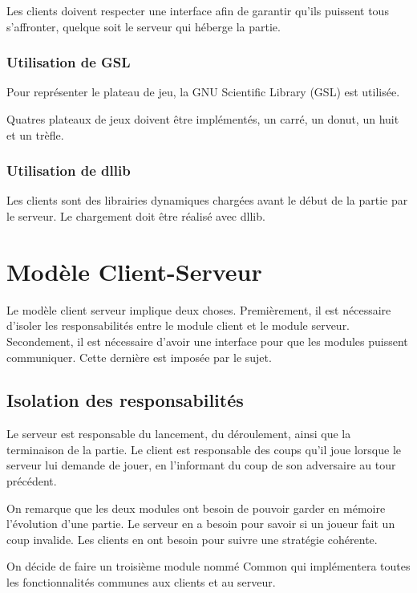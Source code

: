\documentclass{article}
\begin{document}
Les clients doivent respecter une interface afin de garantir qu'ils puissent tous s'affronter,
quelque soit le serveur qui héberge la partie.

\subsubsection{Utilisation de GSL}

Pour représenter le plateau de jeu, la GNU Scientific Library (GSL) est utilisée.

Quatres plateaux de jeux doivent être implémentés, un carré, un donut, un huit et un trèfle.

\subsubsection{Utilisation de dllib}

Les clients sont des librairies dynamiques chargées avant le début de la partie par le serveur.
Le chargement doit être réalisé avec dllib.

\section{Modèle Client-Serveur}

Le modèle client serveur implique deux choses.
Premièrement, il est nécessaire d'isoler les responsabilités entre le module client et le module serveur.
Secondement, il est nécessaire d'avoir une interface pour que les modules puissent communiquer.
Cette dernière est imposée par le sujet.

\subsection{Isolation des responsabilités}

Le serveur est responsable du lancement, du déroulement, ainsi que la terminaison de la partie.
Le client est responsable des coups qu'il joue lorsque le serveur lui demande de jouer, 
en l'informant du coup de son adversaire au tour précédent.

On remarque que les deux modules ont besoin de pouvoir garder en mémoire l'évolution d'une partie.
Le serveur en a besoin pour savoir si un joueur fait un coup invalide.
Les clients en ont besoin pour suivre une stratégie cohérente.

On décide de faire un troisième module nommé Common qui implémentera toutes les fonctionnalités communes 
aux clients et au serveur.
\end{document}
